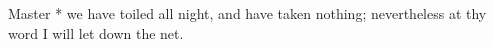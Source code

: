 Master * we have toiled all night, and have taken nothing; nevertheless at thy word I will let down the net.